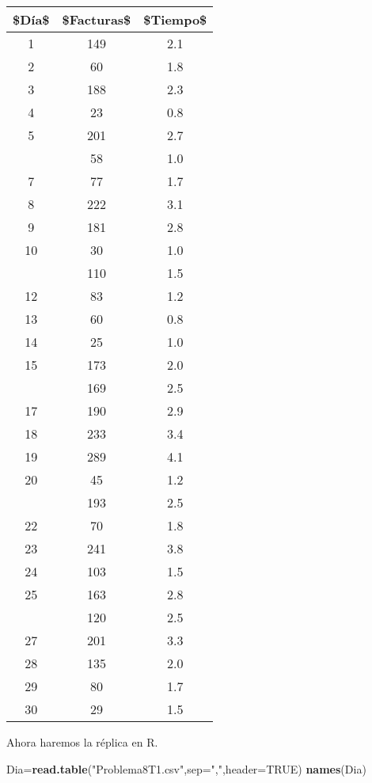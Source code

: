 \documentclass[
  a4paper,
  oneside,
  openany]{book}
\newenvironment{Shaded}{\begin{snugshade}}{\end{snugshade}}
\newcommand{\DataTypeTok}[1]{\textcolor[rgb]{0.13,0.29,0.53}{#1}}
\newcommand{\KeywordTok}[1]{\textcolor[rgb]{0.13,0.29,0.53}{\textbf{#1}}}
\newcommand{\NormalTok}[1]{#1}
\newcommand{\OtherTok}[1]{\textcolor[rgb]{0.56,0.35,0.01}{#1}}
\newcommand{\StringTok}[1]{\textcolor[rgb]{0.31,0.60,0.02}{#1}}
\begin{document}
\begin{table}[H]
\centering
\begin{tabular}{ccc}
\toprule
\$Día\$ & \$Facturas\$ & \$Tiempo\$\\
\midrule
1 & 149 & 2.1\\
2 & 60 & 1.8\\
3 & 188 & 2.3\\
4 & 23 & 0.8\\
5 & 201 & 2.7\\
\addlinespace
6 & 58 & 1.0\\
7 & 77 & 1.7\\
8 & 222 & 3.1\\
9 & 181 & 2.8\\
10 & 30 & 1.0\\
\addlinespace
11 & 110 & 1.5\\
12 & 83 & 1.2\\
13 & 60 & 0.8\\
14 & 25 & 1.0\\
15 & 173 & 2.0\\
\addlinespace
16 & 169 & 2.5\\
17 & 190 & 2.9\\
18 & 233 & 3.4\\
19 & 289 & 4.1\\
20 & 45 & 1.2\\
\addlinespace
21 & 193 & 2.5\\
22 & 70 & 1.8\\
23 & 241 & 3.8\\
24 & 103 & 1.5\\
25 & 163 & 2.8\\
\addlinespace
26 & 120 & 2.5\\
27 & 201 & 3.3\\
28 & 135 & 2.0\\
29 & 80 & 1.7\\
30 & 29 & 1.5\\
\bottomrule
\end{tabular}
\end{table}

Ahora haremos la réplica en R.

\begin{Shaded}
\begin{Highlighting}[]
\NormalTok{Dia=}\KeywordTok{read.table}\NormalTok{(}\StringTok{"Problema8T1.csv"}\NormalTok{,}\DataTypeTok{sep=}\StringTok{","}\NormalTok{,}\DataTypeTok{header=}\OtherTok{TRUE}\NormalTok{)}
\KeywordTok{names}\NormalTok{(Dia)}
\end{Highlighting}
\end{Shaded}
\end{document}
